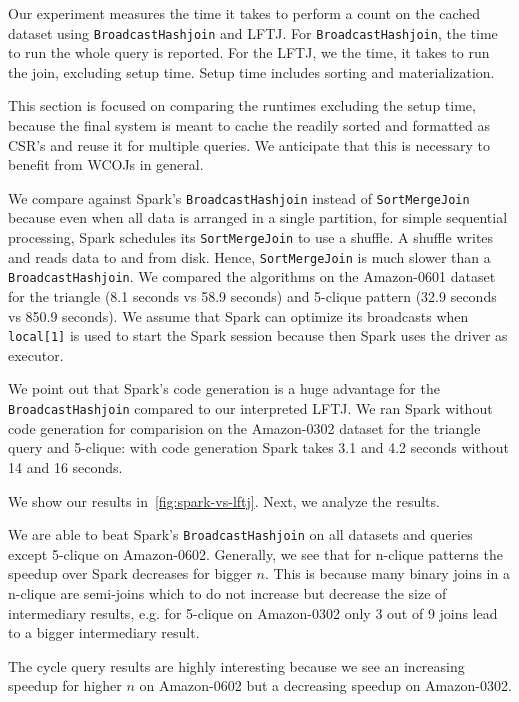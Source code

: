 Our experiment measures the time it takes to perform a count on the cached dataset using \texttt{BroadcastHashjoin} and
\textsc{LFTJ}.
For \texttt{BroadcastHashjoin}, the time to run the whole query is reported.
For the \textsc{LFTJ}, we the time, it takes to run the join, excluding setup time.
Setup time includes sorting and materialization.

This section is focused on comparing the runtimes excluding the setup time, because the final system is meant to cache the readily sorted
and formatted as \textsc{CSR}'s and reuse it for multiple queries.
We anticipate that this is necessary to benefit from \textsc{WCOJ}s in general.

We compare against Spark's \texttt{BroadcastHashjoin} instead of \texttt{SortMergeJoin} because even when all data is arranged in a single
partition, for simple sequential processing, Spark schedules its \texttt{SortMergeJoin} to use a shuffle.
A shuffle writes and reads data to and from disk.
Hence, \texttt{SortMergeJoin} is much slower than a \texttt{BroadcastHashjoin}.
We compared the algorithms on the Amazon-0601 dataset for the triangle (8.1 seconds vs 58.9 seconds) and
5-clique pattern (32.9 seconds vs 850.9 seconds).
We assume that Spark can optimize its broadcasts when \texttt{local[1]} is used to start the Spark session because then Spark uses the driver as executor.

We point out that Spark's code generation is a huge advantage for the \texttt{BroadcastHashjoin} compared
to our interpreted \textsc{LFTJ}.
We ran Spark without code generation for comparision on the Amazon-0302 dataset for the triangle
query and 5-clique: with code generation Spark takes 3.1 and 4.2 seconds without 14 and 16 seconds.

We show our results in~\cref{fig:spark-vs-lftj}.
Next, we analyze the results.

We are able to beat Spark's \texttt{BroadcastHashjoin} on all datasets and queries except 5-clique on Amazon-0602.
Generally, we see that for n-clique patterns the speedup over Spark decreases for bigger $n$.
This is because many binary joins in a n-clique are semi-joins which to do not increase but decrease the size of intermediary results,
e.g. for 5-clique on Amazon-0302 only 3 out of 9 joins lead to a bigger intermediary result.

The cycle query results are highly interesting because we see an increasing speedup for higher $n$ on Amazon-0602 but a
decreasing speedup on Amazon-0302.

